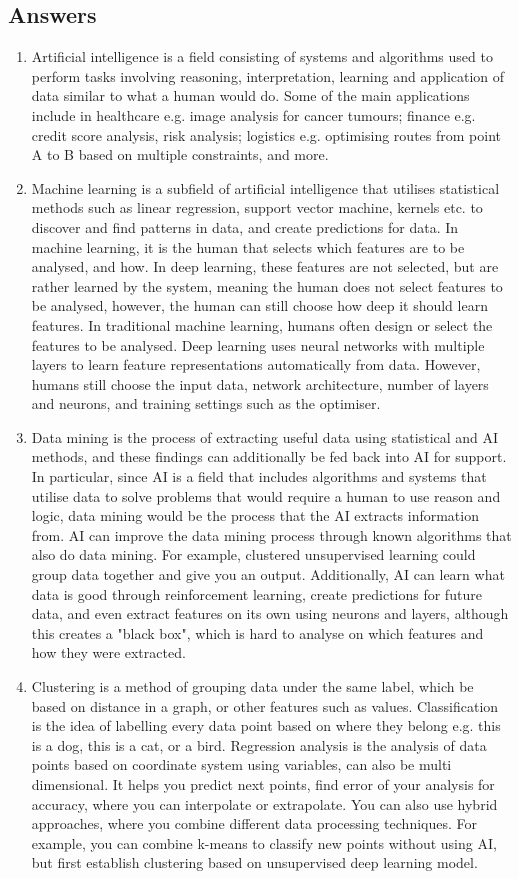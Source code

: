 \documentclass[a4paper, 12pt]{article}
\theoremstyle{plain}
\theoremstyle{definition}
\theoremstyle{remark}
\begin{document}
\subsection{Answers}
\begin{enumerate}
	\item Artificial intelligence is a field consisting of systems and algorithms used to perform tasks involving reasoning, interpretation, learning and application of data similar to what a human would do. Some of the main applications include in healthcare e.g. image analysis for cancer tumours; finance e.g. credit score analysis, risk analysis; logistics e.g. optimising routes from point A to B based on multiple constraints, and more.
	\item Machine learning is a subfield of artificial intelligence that utilises statistical methods such as linear regression, support vector machine, kernels etc. to discover and find patterns in data, and create predictions for data. In machine learning, it is the human that selects which features are to be analysed, and how. In deep learning, these features are not selected, but are rather learned by the system, meaning the human does not select features to be analysed, however, the human can still choose how deep it should learn features. In traditional machine learning, humans often design or select the features to be analysed. Deep learning uses neural networks with multiple layers to learn feature representations automatically from data. However, humans still choose the input data, network architecture, number of layers and neurons, and training settings such as the optimiser. 
	\item Data mining is the process of extracting useful data using statistical and AI methods, and these findings can additionally be fed back into AI for support. In particular, since AI is a field that includes algorithms and systems that utilise data to solve problems that would require a human to use reason and logic, data mining would be the process that the AI extracts information from. AI can improve the data mining process through known algorithms that also do data mining. For example, clustered unsupervised learning could group data together and give you an output. Additionally, AI can learn what data is good through reinforcement learning, create predictions for future data, and even extract features on its own using neurons and layers, although this creates a "black box", which is hard to analyse on which features and how they were extracted.
	\item Clustering is a method of grouping data under the same label, which be based on distance in a graph, or other features such as values. Classification is the idea of labelling every data point based on where they belong e.g. this is a dog, this is a cat, or a bird. Regression analysis is the analysis of data points based on coordinate system using variables, can also be multi dimensional. It helps you predict next points, find error of your analysis for accuracy, where you can interpolate or extrapolate. You can also use hybrid approaches, where you combine different data processing techniques. For example, you can combine k-means to classify new points without using AI, but first establish clustering based on unsupervised deep learning model.

\end{enumerate}
\end{document}
